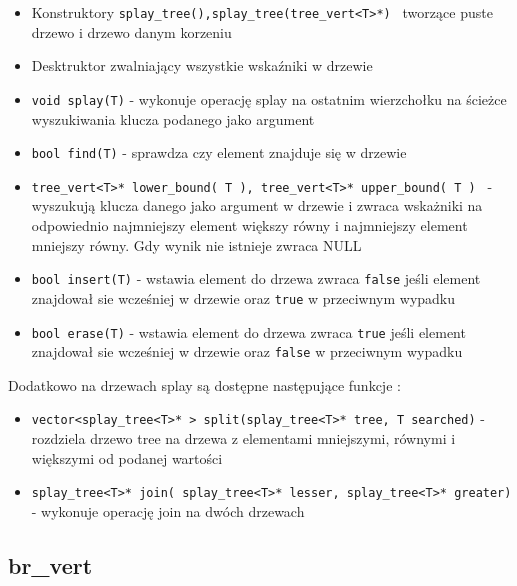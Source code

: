 \documentclass[declaration,shortabstract]{iithesis}
\theoremstyle{thm}
\theoremstyle{remark}
\theoremstyle{plain}
\theoremstyle{plain}
\theoremstyle{plain}
\begin{document}
\begin{itemize}

\item{Konstruktory \texttt{splay\_tree(),splay\_tree(tree\_vert<T>*) } tworzące puste drzewo i drzewo danym korzeniu }

\item{Desktruktor zwalniający wszystkie wskaźniki w drzewie}

\item{\texttt{void splay(T)} - wykonuje operację splay na ostatnim wierzchołku na ścieżce wyszukiwania klucza podanego jako argument}

\item{\texttt{bool find(T)} - sprawdza czy element znajduje się w drzewie}
    
\item{\texttt{tree\_vert<T>* lower\_bound( T ), tree\_vert<T>* upper\_bound( T ) } - wyszukują klucza danego jako argument w drzewie i zwraca wskażniki na odpowiednio najmniejszy element większy równy i najmniejszy element mniejszy równy. Gdy wynik nie istnieje zwraca NULL }
   
\item{\texttt{bool insert(T)} - wstawia element do drzewa zwraca \texttt{false} jeśli element znajdował sie wcześniej w drzewie oraz \texttt{true} w przeciwnym wypadku}
\item{\texttt{bool erase(T)} - wstawia element do drzewa zwraca \texttt{true} jeśli element znajdował sie wcześniej w drzewie oraz \texttt{false} w przeciwnym wypadku}

\end{itemize}

Dodatkowo na drzewach splay są dostępne następujące funkcje : 

\begin{itemize}

\item{\texttt{vector<splay\_tree<T>* > split(splay\_tree<T>* tree, T searched)} - rozdziela drzewo tree na drzewa z elementami mniejszymi, równymi i większymi od podanej wartości}
\item{\texttt{splay\_tree<T>* join( splay\_tree<T>* lesser, splay\_tree<T>* greater)} - wykonuje operację join na dwóch drzewach}

\end{itemize}


\subsection{br\_vert}
\end{document}
